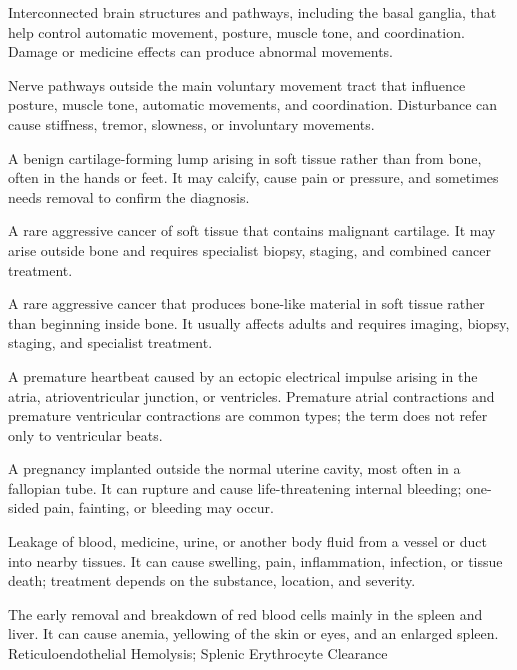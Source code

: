 Interconnected brain structures and pathways, including the basal ganglia, that help control automatic movement, posture, muscle tone, and coordination. Damage or medicine effects can produce abnormal movements.

 Nerve pathways outside the main voluntary movement tract that influence posture, muscle tone, automatic movements, and coordination. Disturbance can cause stiffness, tremor, slowness, or involuntary movements.

 A benign cartilage-forming lump arising in soft tissue rather than from bone, often in the hands or feet. It may calcify, cause pain or pressure, and sometimes needs removal to confirm the diagnosis.

 A rare aggressive cancer of soft tissue that contains malignant cartilage. It may arise outside bone and requires specialist biopsy, staging, and combined cancer treatment.

 A rare aggressive cancer that produces bone-like material in soft tissue rather than beginning inside bone. It usually affects adults and requires imaging, biopsy, staging, and specialist treatment.

 A premature heartbeat caused by an ectopic electrical impulse arising in the atria, atrioventricular junction, or ventricles. Premature atrial contractions and premature ventricular contractions are common types; the term does not refer only to ventricular beats.

 A pregnancy implanted outside the normal uterine cavity, most often in a fallopian tube. It can rupture and cause life-threatening internal bleeding; one-sided pain, fainting, or bleeding may occur.

 Leakage of blood, medicine, urine, or another body fluid from a vessel or duct into nearby tissues. It can cause swelling, pain, inflammation, infection, or tissue death; treatment depends on the substance, location, and severity.

 The early removal and breakdown of red blood cells mainly in the spleen and liver. It can cause anemia, yellowing of the skin or eyes, and an enlarged spleen.
\synonyms
Reticuloendothelial Hemolysis; Splenic Erythrocyte Clearance

